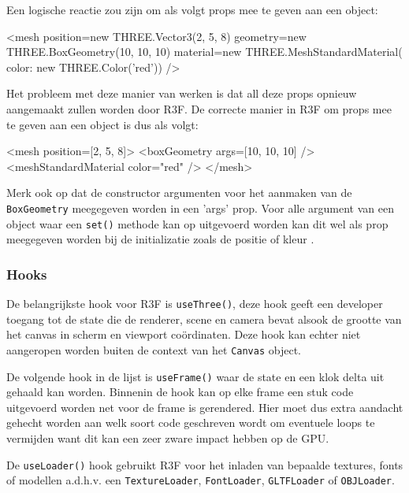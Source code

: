 Een logische reactie zou zijn om als volgt props mee te geven aan een object:

\begin{LVerbatim}
<mesh
	position={new THREE.Vector3(2, 5, 8)}
	geometry={new THREE.BoxGeometry(10, 10, 10)}
	material={new THREE.MeshStandardMaterial({ color: new THREE.Color('red')})}
/>
\end{LVerbatim}

Het probleem met deze manier van werken is dat all deze props opnieuw aangemaakt zullen worden door R3F. De correcte manier in R3F om props mee te geven aan een object is dus als volgt:

\begin{LVerbatim}
<mesh position={[2, 5, 8]}>
	<boxGeometry args={[10, 10, 10]} />
	<meshStandardMaterial color="red" />
</mesh>
\end{LVerbatim}

Merk ook op dat de constructor argumenten voor het aanmaken van de \texttt{BoxGeometry} meegegeven worden in een 'args' prop. Voor alle argument van een object waar een \texttt{set()} methode kan op uitgevoerd worden kan dit wel als prop meegegeven worden bij de initializatie zoals de positie of kleur \autocite{reactThreeFiber2023}.

\subsubsection{Hooks}

De belangrijkste hook voor R3F is \texttt{useThree()}, deze hook geeft een developer toegang tot de state die de renderer, scene en camera bevat alsook de grootte van het canvas in scherm en viewport coördinaten. Deze hook kan echter niet aangeropen worden buiten de context van het \texttt{Canvas} object.

De volgende hook in de lijst is \texttt{useFrame()} waar de state en een klok delta uit gehaald kan worden. Binnenin de hook kan op elke frame een stuk code uitgevoerd worden net voor de frame is gerendered. Hier moet dus extra aandacht gehecht worden aan welk soort code geschreven wordt om eventuele loops te vermijden want dit kan een zeer zware impact hebben op de GPU.

De \texttt{useLoader()} hook gebruikt R3F voor het inladen van bepaalde textures, fonts of modellen a.d.h.v. een \texttt{TextureLoader}, \texttt{FontLoader}, \texttt{GLTFLoader} of \texttt{OBJLoader}.
